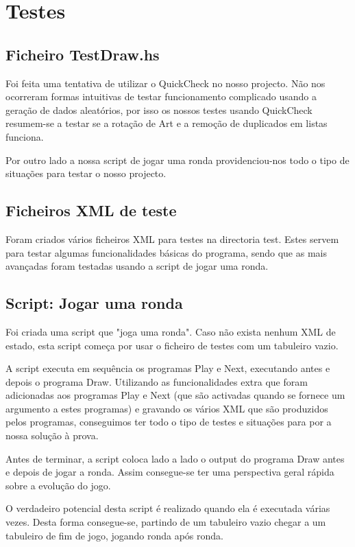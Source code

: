 \documentclass[11pt, a4paper, twoside]{article}
\begin{document}
\newpage
\section{Testes}

\subsection{Ficheiro TestDraw.hs}
Foi feita uma tentativa de utilizar o QuickCheck no nosso projecto. Não nos ocorreram formas intuitivas de testar funcionamento complicado usando a geração de dados aleatórios, por isso os nossos testes usando QuickCheck resumem-se a testar se a rotação de Art e a remoção de duplicados em listas funciona.

Por outro lado a nossa script de jogar uma ronda providenciou-nos todo o tipo de situações para testar o nosso projecto.

\subsection{Ficheiros XML de teste}
Foram criados vários ficheiros XML para testes na directoria test. Estes servem para testar algumas funcionalidades básicas do programa, sendo que as mais avançadas foram testadas usando a script de jogar uma ronda.

\subsection{Script: Jogar uma ronda}
Foi criada uma script que "joga uma ronda". Caso não exista nenhum XML de estado, esta script começa por usar o ficheiro de testes com um tabuleiro vazio.

A script executa em sequência os programas Play e Next, executando antes e depois o programa Draw. Utilizando as funcionalidades extra que foram adicionadas aos programas Play e Next (que são activadas quando se fornece um argumento a estes programas) e gravando os vários XML que são produzidos pelos programas, conseguimos ter todo o tipo de testes e situações para por a nossa solução à prova.

Antes de terminar, a script coloca lado a lado o output do programa Draw antes e depois de jogar a ronda. Assim consegue-se ter uma perspectiva geral rápida sobre a evolução do jogo.

O verdadeiro potencial desta script é realizado quando ela é executada várias vezes. Desta forma consegue-se, partindo de um tabuleiro vazio chegar a um tabuleiro de fim de jogo, jogando ronda após ronda.
\end{document}
